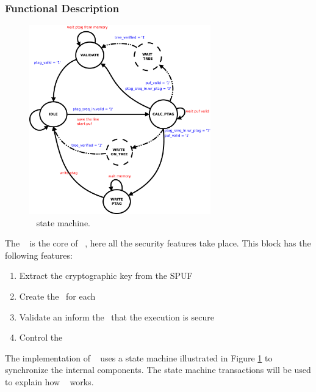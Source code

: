 \subsubsection{Functional Description}

\begin{figure}[!ht]
    \centering
    \includegraphics[width=0.70\textwidth]{figures/pdf/sec_engine_sm.pdf}
    \caption{\seceng~ state  machine. }
    \label{fig:sesm}
\end{figure}

The \seceng~ is the core of \cshia~, here all the security features take place. This block has the following features: 
\begin{enumerate}
    \item Extract the cryptographic key from the SPUF
    \item Create the \ptags~for each \sline
    \item Validate \ptags an inform the \handler~that the execution is secure
    \item Control the \ptagmem~ 
\end{enumerate}
 The implementation of \seceng~ uses a state machine illustrated in Figure \ref{fig:sesm} to synchronize the internal components. The state machine transactions will be used to explain  how \seceng~ works.


